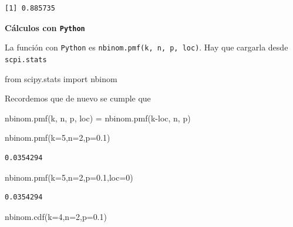 \documentclass[
  letterpaper,
  DIV=11,
  numbers=noendperiod]{scrreprt}
\newenvironment{Shaded}{\begin{snugshade}}{\end{snugshade}}
\newcommand{\DecValTok}[1]{\textcolor[rgb]{0.68,0.00,0.00}{#1}}
\newcommand{\FloatTok}[1]{\textcolor[rgb]{0.68,0.00,0.00}{#1}}
\newcommand{\ImportTok}[1]{\textcolor[rgb]{0.00,0.46,0.62}{#1}}
\newcommand{\NormalTok}[1]{\textcolor[rgb]{0.00,0.23,0.31}{#1}}
\newcommand{\OperatorTok}[1]{\textcolor[rgb]{0.37,0.37,0.37}{#1}}
\begin{document}
\begin{verbatim}
[1] 0.885735
\end{verbatim}

\textbf{Cálculos con \texttt{Python}}

La función con \texttt{Python} es \texttt{nbinom.pmf(k,\ n,\ p,\ loc)}.
Hay que cargarla desde \texttt{scpi.stats}

\begin{Shaded}
\begin{Highlighting}[]
\ImportTok{from}\NormalTok{ scipy.stats }\ImportTok{import}\NormalTok{ nbinom}
\end{Highlighting}
\end{Shaded}

Recordemos que de nuevo se cumple que

\begin{Shaded}
\begin{Highlighting}[]
\NormalTok{nbinom.pmf(k, n, p, loc) }\OperatorTok{=}\NormalTok{ nbinom.pmf(k}\OperatorTok{{-}}\NormalTok{loc, n, p)\textasciigrave{}}
\end{Highlighting}
\end{Shaded}

\begin{Shaded}
\begin{Highlighting}[]
\NormalTok{nbinom.pmf(k}\OperatorTok{=}\DecValTok{5}\NormalTok{,n}\OperatorTok{=}\DecValTok{2}\NormalTok{,p}\OperatorTok{=}\FloatTok{0.1}\NormalTok{)}
\end{Highlighting}
\end{Shaded}

\begin{verbatim}
0.0354294
\end{verbatim}

\begin{Shaded}
\begin{Highlighting}[]
\NormalTok{nbinom.pmf(k}\OperatorTok{=}\DecValTok{5}\NormalTok{,n}\OperatorTok{=}\DecValTok{2}\NormalTok{,p}\OperatorTok{=}\FloatTok{0.1}\NormalTok{,loc}\OperatorTok{=}\DecValTok{0}\NormalTok{)}
\end{Highlighting}
\end{Shaded}

\begin{verbatim}
0.0354294
\end{verbatim}

\begin{Shaded}
\begin{Highlighting}[]
\NormalTok{nbinom.cdf(k}\OperatorTok{=}\DecValTok{4}\NormalTok{,n}\OperatorTok{=}\DecValTok{2}\NormalTok{,p}\OperatorTok{=}\FloatTok{0.1}\NormalTok{)}
\end{Highlighting}
\end{Shaded}
\end{document}
